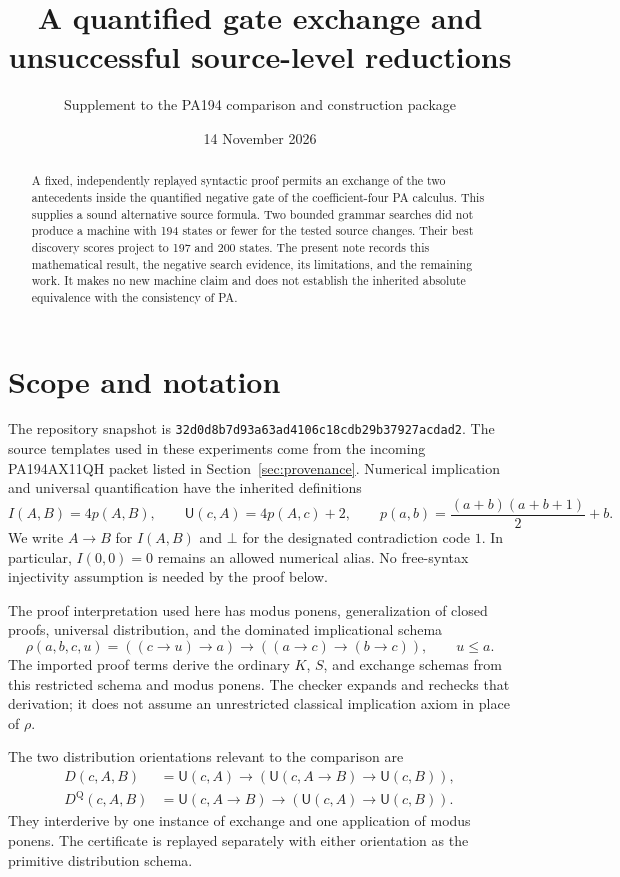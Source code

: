 \documentclass[11pt]{article}
\title{A quantified gate exchange and unsuccessful source-level reductions}
\author{Supplement to the PA194 comparison and construction package}
\date{14 November 2026}
\newcommand{\imp}{\mathbin{\to}}
\newcommand{\U}{\mathsf U}
\begin{document}
\maketitle

\begin{abstract}
A fixed, independently replayed syntactic proof permits an exchange of the
two antecedents inside the quantified negative gate of the coefficient-four
PA calculus. This supplies a sound alternative source formula. Two bounded
grammar searches did not produce a machine with 194 states or fewer for the
tested source changes. Their best discovery scores project to 197 and 200
states. The present note records this mathematical result, the negative
search evidence, its limitations, and the remaining work. It makes no new
machine claim and does not establish the inherited absolute equivalence
with the consistency of PA.
\end{abstract}

\section{Scope and notation}

The repository snapshot is
\texttt{32d0d8b7d93a63ad4106c18cdb29b37927acdad2}.
The source templates used in these experiments come from the incoming
PA194AX11QH packet listed in Section~\ref{sec:provenance}.
Numerical implication and universal quantification have the inherited
definitions
\[
 I(A,B)=4p(A,B),\qquad \U(c,A)=4p(A,c)+2,
 \qquad p(a,b)=\frac{(a+b)(a+b+1)}2+b.
\]
We write $A\imp B$ for $I(A,B)$ and $\bot$ for the designated contradiction
code $1$. In particular, $I(0,0)=0$ remains an allowed numerical alias.
No free-syntax injectivity assumption is needed by the proof below.

The proof interpretation used here has modus ponens, generalization of
closed proofs, universal distribution, and the dominated implicational
schema
\[
 \rho(a,b,c,u)=((c\imp u)\imp a)\imp((a\imp c)\imp(b\imp c)),
 \qquad u\le a.
\]
The imported proof terms derive the ordinary $K$, $S$, and exchange
schemas from this restricted schema and modus ponens. The checker expands
and rechecks that derivation; it does not assume an unrestricted classical
implication axiom in place of $\rho$.

The two distribution orientations relevant to the comparison are
\begin{align*}
 D(c,A,B)&=\U(c,A)\imp
       (\U(c,A\imp B)\imp\U(c,B)),\\
 D^{\mathrm Q}(c,A,B)&=\U(c,A\imp B)\imp
       (\U(c,A)\imp\U(c,B)).
\end{align*}
They interderive by one instance of exchange and one application of modus
ponens. The certificate is replayed separately with either orientation
as the primitive distribution schema.
\end{document}
